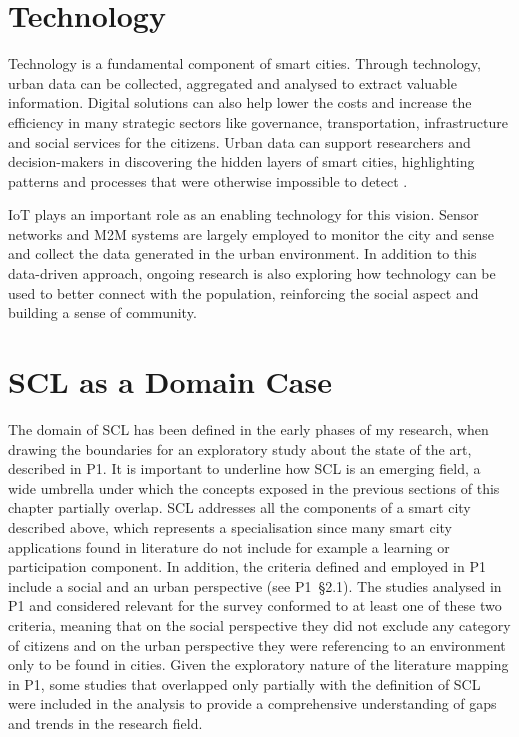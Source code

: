 \section{Technology}

Technology is a fundamental component of smart cities. Through technology, urban data can be collected, aggregated and analysed to extract valuable information. Digital solutions can also help lower the costs and increase the efficiency in many strategic sectors like governance, transportation, infrastructure and social services for the citizens. Urban data can support researchers and decision-makers in discovering the hidden layers of smart cities, highlighting patterns and processes that were otherwise impossible to detect \autocite{vazifeh_addressing_2018}.

IoT plays an important role as an enabling technology for this vision. Sensor networks and M2M systems are largely employed to monitor the city and sense and collect the data generated in the urban environment. In addition to this data-driven approach, ongoing research is also exploring how technology can be used to better connect with the population, reinforcing the social aspect and building a sense of community.


\section{SCL as a Domain Case}

The domain of SCL has been defined in the early phases of my research, when drawing the boundaries for an exploratory study about the state of the art, described in P1. It is important to underline how SCL is an emerging field, a wide umbrella under which the concepts exposed in the previous sections of this chapter partially overlap. SCL addresses all the components of a smart city described above, which represents a specialisation since many smart city applications found in literature do not include for example a learning or participation component. In addition, the criteria defined and employed in P1 include a social and an urban perspective (see P1~\S2.1).
The studies analysed in P1 and considered relevant for the survey conformed to at least one of these two criteria, meaning that on the social perspective they did not exclude any category of citizens and on the urban perspective they were referencing to an environment only to be found in cities. Given the exploratory nature of the literature mapping in P1, some studies that overlapped only partially with the definition of SCL were included in the analysis to provide a comprehensive understanding of gaps and trends in the research field.


